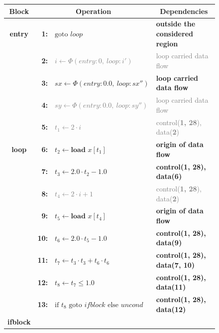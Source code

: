 \begin{figure}[p]
\centering
\begin{tabular}{|c|rl|l|}
\hline
\multicolumn{1}{|c}{\bf Block} &  \multicolumn{2}{|c|}{\bf Operation} & \multicolumn{1}{c|}{\bf Dependencies} \\
\hline
\hline
\multirow{1}{*}{\bf entry}
  & {\bf 1:} & \textcolor{color_strings}{$\text{goto }loop$}&\textcolor{color_strings}{\bf outside the considered region}\\
\hline
\multirow{9}{*}{\bf loop\vspace{4.5mm}}
  & {\bf  2:} & \textcolor{gray}{$i\leftarrow \Phi(entry:0,\ loop:i')$}&\textcolor{gray}{loop carried data flow}\\[-1.7mm]
  & {\bf  3:} & \textcolor{color_types}{$sx\leftarrow \Phi(entry:0.0,\ loop:sx'')$}&\textcolor{color_types}{\bf loop carried data flow}\\[-1.7mm]
  & {\bf  4:} & \textcolor{gray}{$sy\leftarrow \Phi(entry:0.0,\ loop:sy'')$}&\textcolor{gray}{loop carried data flow}\\[-1.7mm]
  & {\bf  5:} & \textcolor{gray}{$t_1\leftarrow 2\cdot i$}&\textcolor{gray}{control({\bf 1, 28}), data({\bf 2})}\\[-1.7mm]
  & {\bf  6:} & \textcolor{color_types}{$t_2\leftarrow\textbf{load }x[t_1]$}&\textcolor{color_types}{\bf origin of data flow}\\[-1.7mm]
  & {\bf  7:} & $t_3\leftarrow 2.0\cdot t_2-1.0$&{\bf control({\bf 1, 28}), data({\bf 6})}\\[-1.7mm]
  & {\bf  8:} & \textcolor{gray}{$t_4\leftarrow 2\cdot i+1$}&\textcolor{gray}{control({\bf 1, 28}), data({\bf 2})}\\[-1.7mm]
  & {\bf  9:} & \textcolor{color_types}{$t_5\leftarrow\textbf{load }x[t_4]$}&\textcolor{color_types}{\bf origin of data flow}\\[-1.7mm]
  & {\bf 10:} & $t_6\leftarrow 2.0\cdot t_5-1.0$&{\bf control({\bf 1, 28}), data({\bf 9})}\\[-1.7mm]
  & {\bf 11:} & $t_7\leftarrow t_3\cdot t_3+t_6\cdot t_6$&{\bf control({\bf 1, 28}), data({\bf 7, 10})}\\[-1.7mm]
  & {\bf 12:} & $t_8\leftarrow t_7\leq1.0$&{\bf control({\bf 1, 28}), data({\bf 11})}\\[-1.7mm]
  & {\bf 13:} & $\text{if }t_8\text{ goto }ifblock\text{ else }uncond$&{\bf control({\bf 1, 28}), data({\bf 12})}\\
\hline
\multirow{8}{*}{\bf ifblock\vspace{3mm}}

\end{tabular}
\end{figure}
